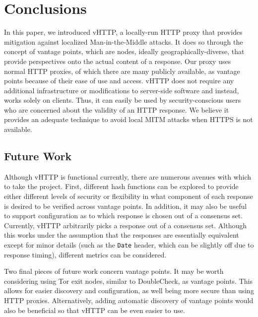 \section{Conclusions}
\label{sec:conclusion}

In this paper, we introduced vHTTP, a locally-run HTTP proxy that provides
mitigation against localized Man-in-the-Middle attacks. It does so through the
concept of vantage points, which are nodes, ideally geographically-diverse,
that provide perspectives onto the actual content of a response. Our proxy
uses normal HTTP proxies, of which there are many publicly available, as
vantage points because of their ease of use and access. vHTTP does not require
any additional infrastructure or modifications to server-side software and
instead, works solely on clients. Thus, it can easily be used by
security-conscious users who are concerned about the validity of an HTTP
response. We believe it provides an adequate technique to avoid local MITM
attacks when HTTPS is not available.

\subsection{Future Work}

Although vHTTP is functional currently, there are numerous avenues with which
to take the project. First, different hash functions can be explored to provide
either different levels of security or flexibility in what component of each
response is desired to be verified across vantage points. In addition,
it may also be useful to support configuration as to which response is chosen
out of a consensus set. Currently, vHTTP arbitrarily picks a response out of a
consensus set. Although this works under the assumption that the responses are
essentially equivalent except for minor details (such as the \texttt{Date}
header, which can be slightly off due to response timing), different metrics
can be considered.

Two final pieces of future work concern vantage points. It may be worth
considering using Tor exit nodes, similar to DoubleCheck, as vantage points.
This allows for easier discovery and configuration, as well being more secure
than using HTTP proxies. Alternatively, adding automatic discovery of vantage
points would also be beneficial so that vHTTP can be even easier to use.
